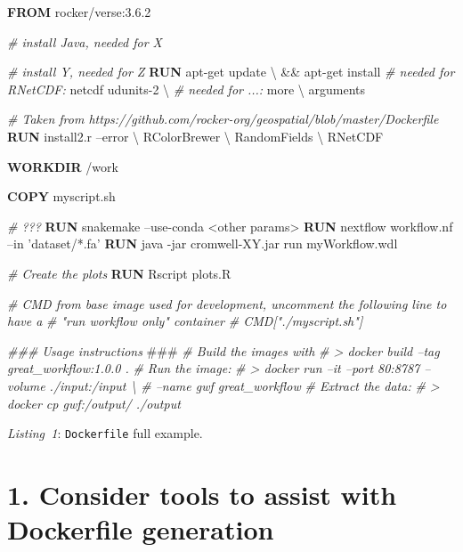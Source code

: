 \documentclass[10pt,letterpaper]{article}
\newenvironment{Shaded}{\begin{snugshade}}{\end{snugshade}}
\newcommand{\AlertTok}[1]{\textcolor[rgb]{0.94,0.16,0.16}{#1}}
\newcommand{\CommentTok}[1]{\textcolor[rgb]{0.56,0.35,0.01}{\textit{#1}}}
\newcommand{\KeywordTok}[1]{\textcolor[rgb]{0.13,0.29,0.53}{\textbf{#1}}}
\newcommand{\NormalTok}[1]{#1}
\newcommand{\StringTok}[1]{\textcolor[rgb]{0.31,0.60,0.02}{#1}}
\begin{document}
\footnotesize

\begin{Shaded}
\begin{Highlighting}[]
\KeywordTok{FROM}\NormalTok{ rocker/verse:3.6.2}

\CommentTok{# install Java, needed for X}

\CommentTok{# install Y, needed for Z}
\KeywordTok{RUN}\NormalTok{ apt-get update \textbackslash{}}
\NormalTok{  && apt-get install}
    \CommentTok{# needed for RNetCDF:}
\NormalTok{    netcdf udunits-2 \textbackslash{}}
    \CommentTok{# needed for ...:}
\NormalTok{    more \textbackslash{}}
\NormalTok{    arguments}

\CommentTok{# Taken from https://github.com/rocker-org/geospatial/blob/master/Dockerfile}
\KeywordTok{RUN}\NormalTok{ install2.r --error \textbackslash{}}
\NormalTok{    RColorBrewer \textbackslash{}}
\NormalTok{    RandomFields \textbackslash{}}
\NormalTok{    RNetCDF}

\KeywordTok{WORKDIR}\NormalTok{ /work}

\KeywordTok{COPY}\NormalTok{ myscript.sh}

\CommentTok{# ???}
\KeywordTok{RUN}\NormalTok{ snakemake --use-conda <other params>}
\KeywordTok{RUN}\NormalTok{ nextflow workflow.nf --in }\StringTok{'dataset/*.fa'}
\KeywordTok{RUN}\NormalTok{ java -jar cromwell-XY.jar run myWorkflow.wdl}

\CommentTok{# Create the plots}
\KeywordTok{RUN}\NormalTok{ Rscript plots.R}

\CommentTok{# CMD from base image used for development, uncomment the following line to have a }
\CommentTok{# "run workflow only" container}
\CommentTok{# CMD["./myscript.sh"]}

\CommentTok{### Usage instructions }\AlertTok{###}
\CommentTok{# Build the images with}
\CommentTok{# > docker build --tag great_workflow:1.0.0 .}
\CommentTok{# Run the image:}
\CommentTok{# > docker run --it --port 80:8787 --volume ./input:/input \textbackslash{}}
\CommentTok{#     --name gwf great_workflow}
\CommentTok{# Extract the data:}
\CommentTok{# > docker cp gwf:/output/ ./output}
\end{Highlighting}
\end{Shaded}

\normalsize

\emph{Listing~1}: \texttt{Dockerfile} full example.

\hypertarget{consider-tools-to-assist-with-dockerfile-generation}{%
\section*{1. Consider tools to assist with Dockerfile
generation}\label{consider-tools-to-assist-with-dockerfile-generation}}
\end{document}
